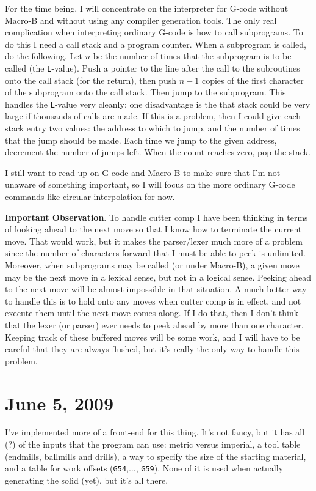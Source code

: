 \documentclass[titlepage,oneside,10pt]{article}
\begin{document}
For the time being, I will concentrate on the interpreter for G-code
without Macro-B and without using any compiler generation tools. The
only real complication when interpreting ordinary G-code is how to
call subprograms. To do this I need a call stack and a program
counter. When a subprogram is called, do the following. Let $n$ be the
number of times that the subprogram is to be called (the 
{\tt L}-value). Push a pointer to the line after the call to the
subroutines onto the call stack (for the return), then push $n-1$
copies of the first character of the subprogram onto the call
stack. Then jump to the subprogram. This handles the {\tt L}-value
very cleanly; one disadvantage is the that stack could be very
large if thousands of calls are made. If this is a problem, then I
could give each stack entry two values: the address to which to jump,
and the number of times that the jump should be made. Each time we
jump to the given address, decrement the number of jumps left. When
the count reaches zero, pop the stack.

I still want to read up on G-code and Macro-B to make sure that I'm
not unaware of something important, so I will focus on the more
ordinary G-code commands like circular interpolation for now.

{\bf Important Observation}. To handle cutter comp I have been
thinking in terms of looking ahead to the next move so that I know how
to terminate the current move. That would work, but it makes the
parser/lexer much more of a problem since the number of characters
forward that I must be able to peek is unlimited. Moreover, when
subprograms may be called (or under Macro-B), a given move may be the
next move in a lexical sense, but not in a logical sense. Peeking
ahead to the next move will be almost impossible in that situation. A
much better way to handle this is to hold onto any moves when cutter
comp is in effect, and not execute them until the next move comes
along. If I do that, then I don't think that the lexer (or parser)
ever needs to peek ahead by more than one character. Keeping track of
these buffered moves will be some work, and I will have to be careful
that they are always flushed, but it's really the only way to handle
this problem.

\section{June 5, 2009}

I've implemented more of a front-end for this thing. It's not fancy,
but it has all (?) of the inputs that the program can use: metric
versus imperial, a tool table (endmills, ballmills and drills), a
way to specify the size of the starting material, and a table for work
offsets ({\tt G54},$\ldots$, {\tt G59}). None of it is used
when actually generating the solid (yet), but it's all there.
\end{document}
